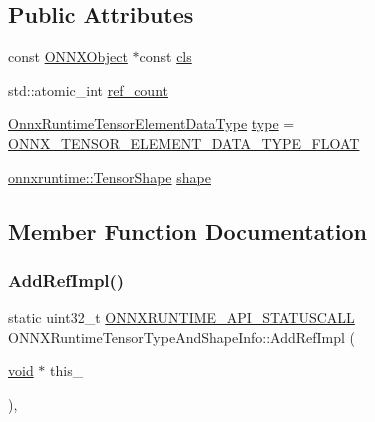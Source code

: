 \subsection*{Public Attributes}
\begin{DoxyCompactItemize}
\item 
const \mbox{\hyperlink{structONNXObject}{O\+N\+N\+X\+Object}} $\ast$const \mbox{\hyperlink{structONNXRuntimeTensorTypeAndShapeInfo_ab2f273a24cd8271724d6c9b469e5ff3b}{cls}}
\item 
std\+::atomic\+\_\+int \mbox{\hyperlink{structONNXRuntimeTensorTypeAndShapeInfo_a365e7d1b11148a68b6a2f36c27229bcd}{ref\+\_\+count}}
\item 
\mbox{\hyperlink{tensor__type__and__shape__c__api_8h_acc48f6a9c9e4d7071352e45ce13324b3}{Onnx\+Runtime\+Tensor\+Element\+Data\+Type}} \mbox{\hyperlink{structONNXRuntimeTensorTypeAndShapeInfo_acd65ed287f2c843d03618772b76a08ab}{type}} = \mbox{\hyperlink{tensor__type__and__shape__c__api_8h_acc48f6a9c9e4d7071352e45ce13324b3ac5b0dfee181c160755ab6d70ec09ecbc}{O\+N\+N\+X\+\_\+\+T\+E\+N\+S\+O\+R\+\_\+\+E\+L\+E\+M\+E\+N\+T\+\_\+\+D\+A\+T\+A\+\_\+\+T\+Y\+P\+E\+\_\+\+F\+L\+O\+AT}}
\item 
\mbox{\hyperlink{classonnxruntime_1_1TensorShape}{onnxruntime\+::\+Tensor\+Shape}} \mbox{\hyperlink{structONNXRuntimeTensorTypeAndShapeInfo_af1c284a4dd9af384513521d0933ff7d7}{shape}}
\end{DoxyCompactItemize}


\subsection{Member Function Documentation}
\mbox{\label{structONNXRuntimeTensorTypeAndShapeInfo_ab5739090da25c31b51289c6b79b958d8}} 
\subsubsection{\texorpdfstring{Add\+Ref\+Impl()}{AddRefImpl()}}
{\footnotesize\ttfamily static uint32\+\_\+t \mbox{\hyperlink{error__code_8h_aeaeecdc9b792735c3e26fc0f9815c988}{O\+N\+N\+X\+R\+U\+N\+T\+I\+M\+E\+\_\+\+A\+P\+I\+\_\+\+S\+T\+A\+T\+U\+S\+C\+A\+LL}} O\+N\+N\+X\+Runtime\+Tensor\+Type\+And\+Shape\+Info\+::\+Add\+Ref\+Impl (\begin{DoxyParamCaption}\item[{\mbox{\hyperlink{mlasi_8h_a88f941d423cb2a819b70a1358982b1a6}{void}} $\ast$}]{this\+\_\+ }\end{DoxyParamCaption})\hspace{0.3cm}{\ttfamily [inline]}, {\ttfamily [static]}}

